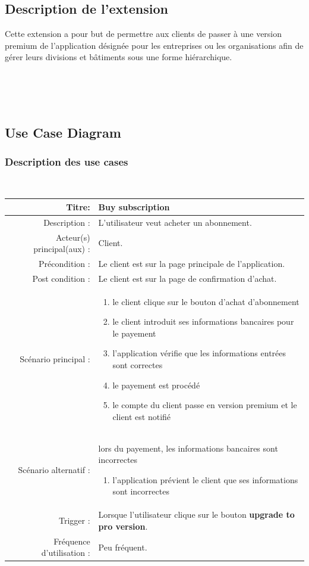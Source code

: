 \documentclass{report}
\begin{document}
\subsection{Description de l'extension}

Cette extension a pour but de permettre aux clients de passer à une version premium de l'application désignée pour les entreprises ou les organisations afin de gérer leurs divisions et bâtiments sous une forme hiérarchique.

\\\\\\
\subsection{Use Case Diagram}
\subsubsection{Description des use cases}
\noindent \\
\begin{tabular}{|r|p{9cm}|}
    \hline
    Titre: & Buy subscription \\
    \hline
    Description : & L'utilisateur veut acheter un abonnement. \\
    \hline
    Acteur(s) principal(aux) : & Client. \\
    \hline
    Précondition : & Le client est sur la page principale de l'application. \\
    \hline
    Post condition : & Le client est sur la page de confirmation d'achat. \\
    \hline
    Scénario principal : & \begin{enumerate}[left=0pt, topsep=0pt]
        \item le client clique sur le bouton d'achat d'abonnement
        \item le client introduit ses informations bancaires pour le payement
        \item l'application vérifie que les informations entrées sont correctes 
        \item le payement est procédé
        \item le compte du client passe en version premium et le client est notifié 
    \end{enumerate} \nointerlineskip \\
    \hline
    Scénario alternatif : & lors du payement, les informations bancaires sont incorrectes 
    \begin{enumerate}[left=0pt, topsep=0pt]
    		\item l'application prévient le client que ses informations sont incorrectes
    \end{enumerate} \nointerlineskip \\
    \hline
    Trigger : & Lorsque l'utilisateur clique sur le bouton \textbf{upgrade to pro version}. \\
    \hline
    Fréquence d'utilisation : & Peu fréquent. \\
    \hline
\end{tabular}
\end{document}
